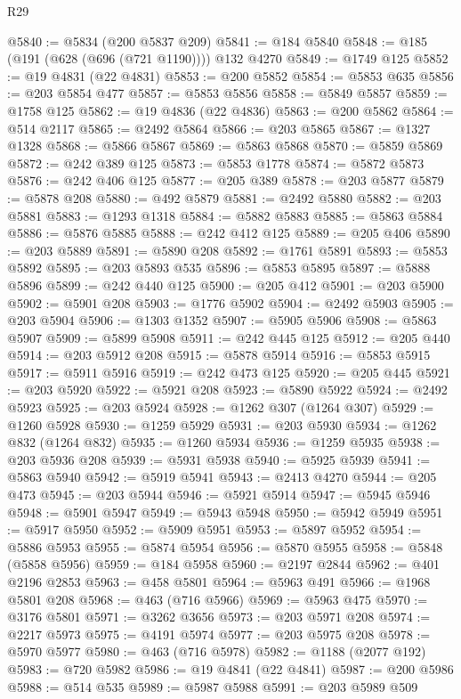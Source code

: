 \begin{lexlean}{R29}
\begin{coremodule}
@5840 := @5834 (@200 @5837 @209)
@5841 := @184 @5840
@5848 := @185 (@191 (@628 (@696 (@721 @1190)))) @132 @4270
@5849 := @1749 @125
@5852 := @19 @4831 (@22 @4831)
@5853 := @200 @5852
@5854 := @5853 @635
@5856 := @203 @5854 @477
@5857 := @5853 @5856
@5858 := @5849 @5857
@5859 := @1758 @125
@5862 := @19 @4836 (@22 @4836)
@5863 := @200 @5862
@5864 := @514 @2117
@5865 := @2492 @5864
@5866 := @203 @5865
@5867 := @1327 @1328
@5868 := @5866 @5867
@5869 := @5863 @5868
@5870 := @5859 @5869
@5872 := @242 @389 @125
@5873 := @5853 @1778
@5874 := @5872 @5873
@5876 := @242 @406 @125
@5877 := @205 @389
@5878 := @203 @5877
@5879 := @5878 @208
@5880 := @492 @5879
@5881 := @2492 @5880
@5882 := @203 @5881
@5883 := @1293 @1318
@5884 := @5882 @5883
@5885 := @5863 @5884
@5886 := @5876 @5885
@5888 := @242 @412 @125
@5889 := @205 @406
@5890 := @203 @5889
@5891 := @5890 @208
@5892 := @1761 @5891
@5893 := @5853 @5892
@5895 := @203 @5893 @535
@5896 := @5853 @5895
@5897 := @5888 @5896
@5899 := @242 @440 @125
@5900 := @205 @412
@5901 := @203 @5900
@5902 := @5901 @208
@5903 := @1776 @5902
@5904 := @2492 @5903
@5905 := @203 @5904
@5906 := @1303 @1352
@5907 := @5905 @5906
@5908 := @5863 @5907
@5909 := @5899 @5908
@5911 := @242 @445 @125
@5912 := @205 @440
@5914 := @203 @5912 @208
@5915 := @5878 @5914
@5916 := @5853 @5915
@5917 := @5911 @5916
@5919 := @242 @473 @125
@5920 := @205 @445
@5921 := @203 @5920
@5922 := @5921 @208
@5923 := @5890 @5922
@5924 := @2492 @5923
@5925 := @203 @5924
@5928 := @1262 @307 (@1264 @307)
@5929 := @1260 @5928
@5930 := @1259 @5929
@5931 := @203 @5930
@5934 := @1262 @832 (@1264 @832)
@5935 := @1260 @5934
@5936 := @1259 @5935
@5938 := @203 @5936 @208
@5939 := @5931 @5938
@5940 := @5925 @5939
@5941 := @5863 @5940
@5942 := @5919 @5941
@5943 := @2413 @4270
@5944 := @205 @473
@5945 := @203 @5944
@5946 := @5921 @5914
@5947 := @5945 @5946
@5948 := @5901 @5947
@5949 := @5943 @5948
@5950 := @5942 @5949
@5951 := @5917 @5950
@5952 := @5909 @5951
@5953 := @5897 @5952
@5954 := @5886 @5953
@5955 := @5874 @5954
@5956 := @5870 @5955
@5958 := @5848 (@5858 @5956)
@5959 := @184 @5958
@5960 := @2197 @2844
@5962 := @401 @2196 @2853
@5963 := @458 @5801
@5964 := @5963 @491
@5966 := @1968 @5801 @208
@5968 := @463 (@716 @5966)
@5969 := @5963 @475
@5970 := @3176 @5801
@5971 := @3262 @3656
@5973 := @203 @5971 @208
@5974 := @2217 @5973
@5975 := @4191 @5974
@5977 := @203 @5975 @208
@5978 := @5970 @5977
@5980 := @463 (@716 @5978)
@5982 := @1188 (@2077 @192)
@5983 := @720 @5982
@5986 := @19 @4841 (@22 @4841)
@5987 := @200 @5986
@5988 := @514 @535
@5989 := @5987 @5988
@5991 := @203 @5989 @509

\end{coremodule}
\end{lexlean}
